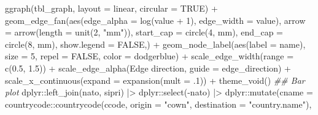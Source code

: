 \documentclass[
  12,
  letterpaper,
  DIV=11,
  numbers=noendperiod]{scrartcl}
\newenvironment{Shaded}{\begin{snugshade}}{\end{snugshade}}
\newcommand{\AttributeTok}[1]{\textcolor[rgb]{0.40,0.45,0.13}{#1}}
\newcommand{\ConstantTok}[1]{\textcolor[rgb]{0.56,0.35,0.01}{#1}}
\newcommand{\DecValTok}[1]{\textcolor[rgb]{0.68,0.00,0.00}{#1}}
\newcommand{\DocumentationTok}[1]{\textcolor[rgb]{0.37,0.37,0.37}{\textit{#1}}}
\newcommand{\FloatTok}[1]{\textcolor[rgb]{0.68,0.00,0.00}{#1}}
\newcommand{\FunctionTok}[1]{\textcolor[rgb]{0.28,0.35,0.67}{#1}}
\newcommand{\NormalTok}[1]{\textcolor[rgb]{0.00,0.23,0.31}{#1}}
\newcommand{\SpecialCharTok}[1]{\textcolor[rgb]{0.37,0.37,0.37}{#1}}
\newcommand{\StringTok}[1]{\textcolor[rgb]{0.13,0.47,0.30}{#1}}
\begin{document}
\begin{Shaded}
\begin{Highlighting}[numbers=left,,]
\FunctionTok{ggraph}\NormalTok{(tbl\_graph,}
       \AttributeTok{layout =} \StringTok{\textquotesingle{}linear\textquotesingle{}}\NormalTok{,}
       \AttributeTok{circular =} \ConstantTok{TRUE}\NormalTok{) }\SpecialCharTok{+}
  \FunctionTok{geom\_edge\_fan}\NormalTok{(}\FunctionTok{aes}\NormalTok{(}\AttributeTok{edge\_alpha =} \FunctionTok{log}\NormalTok{(value }\SpecialCharTok{+} \DecValTok{1}\NormalTok{),}
                    \AttributeTok{edge\_width =}\NormalTok{ value), }
                \AttributeTok{arrow =} \FunctionTok{arrow}\NormalTok{(}\AttributeTok{length =} \FunctionTok{unit}\NormalTok{(}\DecValTok{2}\NormalTok{, }\StringTok{"mm"}\NormalTok{)), }
                \AttributeTok{start\_cap =} \FunctionTok{circle}\NormalTok{(}\DecValTok{4}\NormalTok{, }\StringTok{\textquotesingle{}mm\textquotesingle{}}\NormalTok{),}
                \AttributeTok{end\_cap =} \FunctionTok{circle}\NormalTok{(}\DecValTok{8}\NormalTok{, }\StringTok{\textquotesingle{}mm\textquotesingle{}}\NormalTok{),}
                \AttributeTok{show.legend =} \ConstantTok{FALSE}\NormalTok{,) }\SpecialCharTok{+}
  \FunctionTok{geom\_node\_label}\NormalTok{(}\FunctionTok{aes}\NormalTok{(}\AttributeTok{label =}\NormalTok{ name),}
                 \AttributeTok{size =} \DecValTok{5}\NormalTok{,}
                 \AttributeTok{repel =} \ConstantTok{FALSE}\NormalTok{,}
                 \AttributeTok{color =} \StringTok{\textquotesingle{}dodgerblue\textquotesingle{}}\NormalTok{) }\SpecialCharTok{+}
  \FunctionTok{scale\_edge\_width}\NormalTok{(}\AttributeTok{range =} \FunctionTok{c}\NormalTok{(}\FloatTok{0.5}\NormalTok{, }\FloatTok{1.5}\NormalTok{)) }\SpecialCharTok{+}
  \FunctionTok{scale\_edge\_alpha}\NormalTok{(}\StringTok{\textquotesingle{}Edge direction\textquotesingle{}}\NormalTok{,}
                   \AttributeTok{guide =} \StringTok{\textquotesingle{}edge\_direction\textquotesingle{}}\NormalTok{) }\SpecialCharTok{+}
  \FunctionTok{scale\_x\_continuous}\NormalTok{(}\AttributeTok{expand =} \FunctionTok{expansion}\NormalTok{(}\AttributeTok{mult =}\NormalTok{ .}\DecValTok{1}\NormalTok{)) }\SpecialCharTok{+}
  \FunctionTok{theme\_void}\NormalTok{()}
\DocumentationTok{\#\# Bar plot}
\NormalTok{dplyr}\SpecialCharTok{::}\FunctionTok{left\_join}\NormalTok{(nato, sipri) }\SpecialCharTok{|\textgreater{}}
\NormalTok{  dplyr}\SpecialCharTok{::}\FunctionTok{select}\NormalTok{(}\SpecialCharTok{{-}}\NormalTok{nato) }\SpecialCharTok{|\textgreater{}}
\NormalTok{  dplyr}\SpecialCharTok{::}\FunctionTok{mutate}\NormalTok{(}\AttributeTok{cname =}\NormalTok{ countrycode}\SpecialCharTok{::}\FunctionTok{countrycode}\NormalTok{(ccode, }\AttributeTok{origin =} \StringTok{"cown"}\NormalTok{, }\AttributeTok{destination =} \StringTok{"country.name"}\NormalTok{),}

\end{Highlighting}
\end{Shaded}
\end{document}
